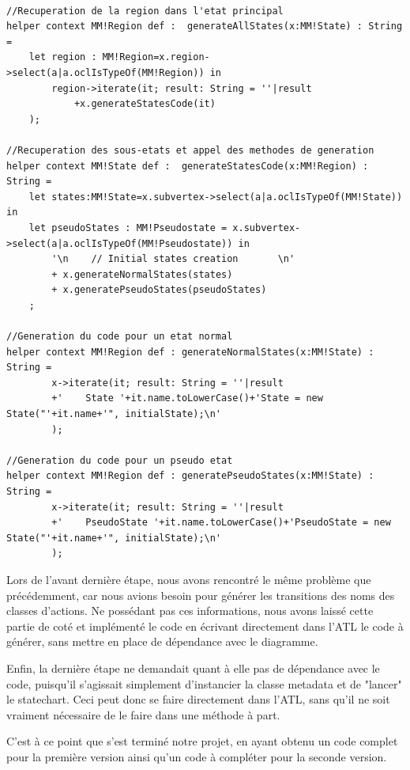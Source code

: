 \documentclass[french, 12pt, a4paper]{article}
\begin{document}
    \begin{lstlisting}[caption={Méthodes de génération des lignes de code pour chaque sous-état, en fonction de son type},basicstyle=\small]

//Recuperation de la region dans l'etat principal        
helper context MM!Region def :  generateAllStates(x:MM!State) : String = 
	let region : MM!Region=x.region->select(a|a.oclIsTypeOf(MM!Region)) in 
		region->iterate(it; result: String = ''|result
			+x.generateStatesCode(it)
	);

//Recuperation des sous-etats et appel des methodes de generation 
helper context MM!State def :  generateStatesCode(x:MM!Region) : String = 
	let states:MM!State=x.subvertex->select(a|a.oclIsTypeOf(MM!State)) in
	let pseudoStates : MM!Pseudostate = x.subvertex->select(a|a.oclIsTypeOf(MM!Pseudostate)) in
		'\n    // Initial states creation		\n'
		+ x.generateNormalStates(states)
		+ x.generatePseudoStates(pseudoStates)	
	;

//Generation du code pour un etat normal
helper context MM!Region def : generateNormalStates(x:MM!State) : String = 
		x->iterate(it; result: String = ''|result
		+'    State '+it.name.toLowerCase()+'State = new State("'+it.name+'", initialState);\n'
		);

//Generation du code pour un pseudo etat
helper context MM!Region def : generatePseudoStates(x:MM!State) : String = 
		x->iterate(it; result: String = ''|result
		+'    PseudoState '+it.name.toLowerCase()+'PseudoState = new State("'+it.name+'", initialState);\n'
		);
    \end{lstlisting}
    
    Lors de l'avant dernière étape, nous avons rencontré le même problème que précédemment, car nous avions besoin pour générer les transitions des noms des classes d'actions. Ne possédant pas ces informations, nous avons laissé cette partie de coté et implémenté le code en écrivant directement dans l'ATL le code à générer, sans mettre en place de dépendance avec le diagramme.
    
    Enfin, la dernière étape ne demandait quant à elle pas de dépendance avec le code, puisqu'il s'agissait simplement d'instancier la classe metadata et de "lancer" le statechart. Ceci peut donc se faire directement dans l'ATL, sans qu'il ne soit vraiment nécessaire de le faire dans une méthode à part.

C'est à ce point que s'est terminé notre projet, en ayant obtenu un code complet pour la première version ainsi qu'un code à compléter pour la seconde version.
\end{document}
